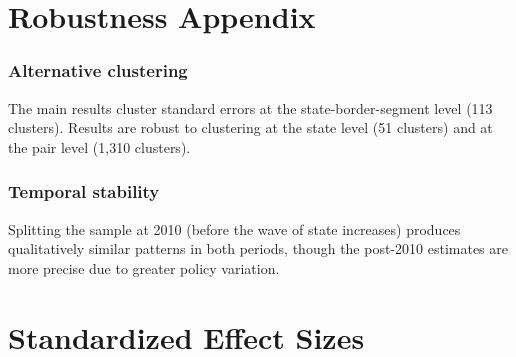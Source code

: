 \documentclass[12pt]{article}
\begin{document}
\section{Robustness Appendix}

\subsubsection*{Alternative clustering} The main results cluster standard errors at the state-border-segment level (113 clusters). Results are robust to clustering at the state level (51 clusters) and at the pair level (1,310 clusters).

\subsubsection*{Temporal stability} Splitting the sample at 2010 (before the wave of state increases) produces qualitatively similar patterns in both periods, though the post-2010 estimates are more precise due to greater policy variation.


\section{Standardized Effect Sizes}
\label{sec:sde}


\end{document}
